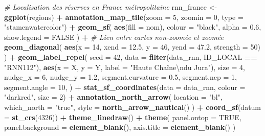 \documentclass[
  french,
]{book}
\newenvironment{Shaded}{\begin{snugshade}}{\end{snugshade}}
\newcommand{\CharTok}[1]{\textcolor[rgb]{0.31,0.60,0.02}{#1}}
\newcommand{\CommentTok}[1]{\textcolor[rgb]{0.56,0.35,0.01}{\textit{#1}}}
\newcommand{\DataTypeTok}[1]{\textcolor[rgb]{0.13,0.29,0.53}{#1}}
\newcommand{\DecValTok}[1]{\textcolor[rgb]{0.00,0.00,0.81}{#1}}
\newcommand{\FloatTok}[1]{\textcolor[rgb]{0.00,0.00,0.81}{#1}}
\newcommand{\KeywordTok}[1]{\textcolor[rgb]{0.13,0.29,0.53}{\textbf{#1}}}
\newcommand{\NormalTok}[1]{#1}
\newcommand{\OperatorTok}[1]{\textcolor[rgb]{0.81,0.36,0.00}{\textbf{#1}}}
\newcommand{\OtherTok}[1]{\textcolor[rgb]{0.56,0.35,0.01}{#1}}
\newcommand{\StringTok}[1]{\textcolor[rgb]{0.31,0.60,0.02}{#1}}
\begin{document}
\begin{Shaded}
\begin{Highlighting}[]
\CommentTok{\# Localisation des réserves en France métropolitaine}
\NormalTok{rnn\_france \textless{}{-}}\StringTok{ }\KeywordTok{ggplot}\NormalTok{(regions) }\OperatorTok{+}
\StringTok{  }\KeywordTok{annotation\_map\_tile}\NormalTok{(}\DataTypeTok{zoom =} \DecValTok{5}\NormalTok{, }\DataTypeTok{zoomin =} \DecValTok{0}\NormalTok{, }\DataTypeTok{type =} \StringTok{"stamenwatercolor"}\NormalTok{) }\OperatorTok{+}
\StringTok{  }\KeywordTok{geom\_sf}\NormalTok{(}
    \KeywordTok{aes}\NormalTok{(}\DataTypeTok{fill =}\NormalTok{ nom),}
    \DataTypeTok{colour =} \StringTok{"black"}\NormalTok{,}
    \DataTypeTok{alpha =} \FloatTok{0.6}\NormalTok{,}
    \DataTypeTok{show.legend =} \OtherTok{FALSE}
\NormalTok{  ) }\OperatorTok{+}
\StringTok{  }\CommentTok{\# Lien entre cartes non{-}zoomée et zoomée}
\StringTok{  }\KeywordTok{geom\_diagonal}\NormalTok{(}
    \KeywordTok{aes}\NormalTok{(}\DataTypeTok{x =} \DecValTok{14}\NormalTok{, }\DataTypeTok{xend =} \FloatTok{12.5}\NormalTok{, }\DataTypeTok{y =} \DecValTok{46}\NormalTok{, }\DataTypeTok{yend =} \FloatTok{47.2}\NormalTok{, }\DataTypeTok{strength =} \DecValTok{50}\NormalTok{)}
\NormalTok{  ) }\OperatorTok{+}
\StringTok{  }\KeywordTok{geom\_label\_repel}\NormalTok{(}
    \DataTypeTok{seed =} \DecValTok{42}\NormalTok{,}
    \DataTypeTok{data =} \KeywordTok{filter}\NormalTok{(data\_rnn, ID\_LOCAL }\OperatorTok{==}\StringTok{ "RNN112"}\NormalTok{),}
    \KeywordTok{aes}\NormalTok{(}\DataTypeTok{x =}\NormalTok{ X, }\DataTypeTok{y =}\NormalTok{ Y, }\DataTypeTok{label =} \StringTok{"Haute Chaîne}\CharTok{\textbackslash{}n}\StringTok{du Jura"}\NormalTok{),}
    \DataTypeTok{size =} \DecValTok{4}\NormalTok{,}
    \DataTypeTok{nudge\_x =} \DecValTok{6}\NormalTok{,}
    \DataTypeTok{nudge\_y =} \FloatTok{1.2}\NormalTok{,}
    \DataTypeTok{segment.curvature =} \FloatTok{0.5}\NormalTok{,}
    \DataTypeTok{segment.ncp =} \DecValTok{1}\NormalTok{,}
    \DataTypeTok{segment.angle =} \DecValTok{10}\NormalTok{,}
\NormalTok{  ) }\OperatorTok{+}
\StringTok{  }\KeywordTok{stat\_sf\_coordinates}\NormalTok{(}\DataTypeTok{data =}\NormalTok{ data\_rnn, }\DataTypeTok{colour =} \StringTok{"darkred"}\NormalTok{, }\DataTypeTok{size =} \DecValTok{2}\NormalTok{) }\OperatorTok{+}
\StringTok{  }\KeywordTok{annotation\_north\_arrow}\NormalTok{(}
    \DataTypeTok{location =} \StringTok{"bl"}\NormalTok{,}
    \DataTypeTok{which\_north =} \StringTok{"true"}\NormalTok{,}
    \DataTypeTok{style =} \KeywordTok{north\_arrow\_nautical}\NormalTok{()}
\NormalTok{  ) }\OperatorTok{+}
\StringTok{  }\KeywordTok{coord\_sf}\NormalTok{(}\DataTypeTok{datum =} \KeywordTok{st\_crs}\NormalTok{(}\DecValTok{4326}\NormalTok{)) }\OperatorTok{+}
\StringTok{  }\KeywordTok{theme\_linedraw}\NormalTok{() }\OperatorTok{+}
\StringTok{  }\KeywordTok{theme}\NormalTok{(}
    \DataTypeTok{panel.ontop =} \OtherTok{TRUE}\NormalTok{,}
    \DataTypeTok{panel.background =} \KeywordTok{element\_blank}\NormalTok{(),}
    \DataTypeTok{axis.title =} \KeywordTok{element\_blank}\NormalTok{()}
\NormalTok{  )}


\end{Highlighting}
\end{Shaded}
\end{document}
